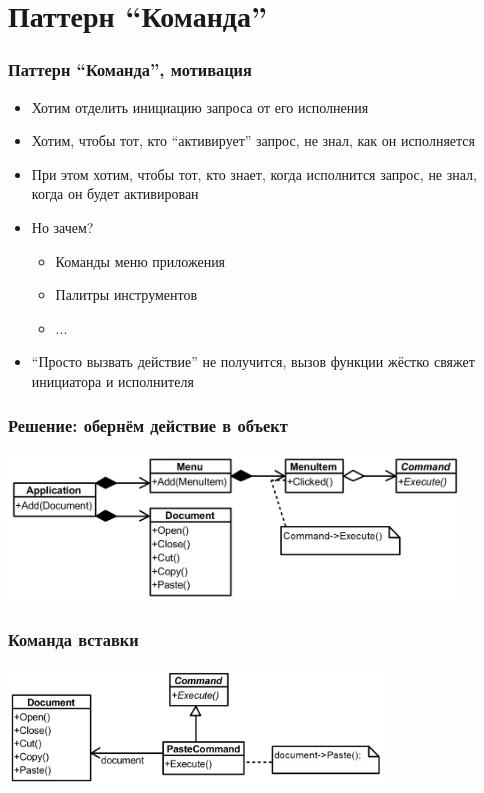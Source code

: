 \documentclass[xetex,mathserif,serif]{beamer}
\begin{document}
	\section{Паттерн ``Команда''}

	\begin{frame}
		\frametitle{Паттерн ``Команда'', мотивация}
		\begin{itemize}
			\item Хотим отделить инициацию запроса от его исполнения
			\item Хотим, чтобы тот, кто ``активирует'' запрос, не знал, как он исполняется
			\item При этом хотим, чтобы тот, кто знает, когда исполнится запрос, не знал, когда он будет активирован
			\item Но зачем?
			\begin{itemize}
				\item Команды меню приложения
				\item Палитры инструментов
				\item ...
			\end{itemize}
			\item ``Просто вызвать действие'' не получится, вызов функции жёстко свяжет инициатора и исполнителя
		\end{itemize}
	\end{frame}

	\begin{frame}
		\frametitle{Решение: обернём действие в объект}
		\begin{center}
			\includegraphics[width=0.9\textwidth]{commandExample.png}
		\end{center}
	\end{frame}

	\begin{frame}
		\frametitle{Команда вставки}
		\begin{center}
			\includegraphics[width=0.75\textwidth]{pasteCommand.png}
		\end{center}
	\end{frame}
\end{document}
